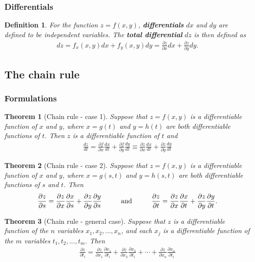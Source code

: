 \documentclass{article}
\theoremstyle{sltheorem}
\newtheorem{definition}{Definition}[section]
\newtheorem{theorem}{Theorem}[section]
\newcommand{\p}{\partial}
\newcommand*\B[1]{\textbf{#1}}
\begin{document}
\subsubsection{Differentials}
\begin{definition}
    For the function $z=f(x,y)$, \B{differentials} $dx$ and $dy$ are
    defined to be independent variables. The \B{total differential} $dz$
    is then defined as
    \begin{align*}
        dz = f_x(x,y)dx + f_y(x,y)dy 
        = \frac{\p z}{\p x}dx + \frac{\p z}{\p y}dy.
    \end{align*}
\end{definition}
\subsection{The chain rule}
\subsubsection{Formulations}
\begin{theorem}[Chain rule - case 1]
    Suppose that $z=f(x,y)$ is a differentiable function of $x$ and $y$,
    where $x=g(t)$ and $y=h(t)$ are both differentiable functions of $t$.
    Then $z$ is a differentiable function of $t$ and
    \begin{align*}
        \frac{dz}{dt}=
        \frac{\p f}{\p x}\frac{dx}{dt}+\frac{\p f}{\p y}\frac{dy}{dt}
        \equiv \frac{\p z}{\p x}\frac{dx}{dt}+\frac{\p z}{\p y}\frac{dy}{dt}
    \end{align*}
\end{theorem}
\begin{theorem}[Chain rule - case 2]
    Suppose that $z=f(x,y)$ is a differentiable function of $x$ and $y$,
    where $x=g(s,t)$ and $y=h(s,t)$ are both differentiable functions of
    $s$ and $t$. Then
    \begin{align*}
        \frac{\p z}{\p s}=\frac{\p z}{\p x}\frac{\p x}{\p s}
        + \frac{\p z}{\p y}\frac{\p y}{\p s}
        \text{\hspace{1cm}and\hspace{1cm}}
        \frac{\p z}{\p t}=\frac{\p z}{\p x}\frac{\p x}{\p t}
        + \frac{\p z}{\p y}\frac{\p y}{\p t}.
    \end{align*} 
\end{theorem}
\begin{theorem}[Chain rule - general case]
    Suppose that $z$ is a differentiable function of the $n$ variables
    $x_1, x_2, ..., x_n$, and each $x_j$ is a differentiable function of
    the $m$ variables $t_1,t_2, ...,t_m$. Then
    \begin{align*}
        \frac{\p z}{\p t_i}=
        \frac{\p z}{\p x_1}\frac{\p x_1}{\p t_i}
        + \frac{\p z}{\p x_2}\frac{\p x_2}{\p t_i}
        + \cdots
        + \frac{\p z}{\p x_n}\frac{\p x_n}{\p t_i}
    \end{align*} 
\end{theorem}
\end{document}
